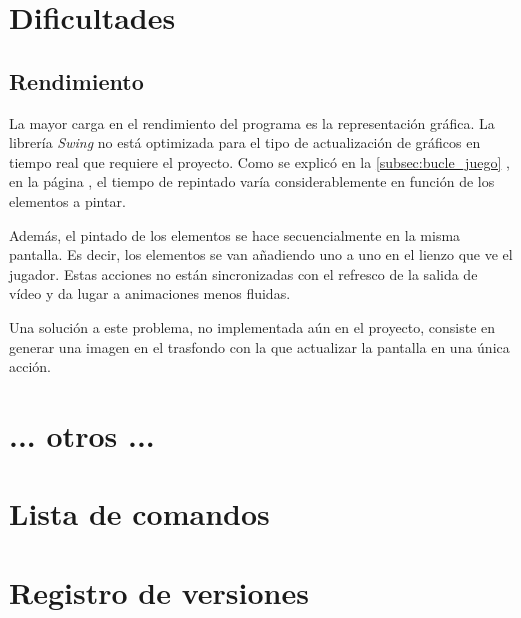 \documentclass[a4paper,
	11pt,
	parskip=full,
	bibliography=totoc,
	twoside
	]{scrartcl}
\let\oldsection\section
\def\section{\cleardoubleoddpage\oldsection}
\renewcommand{\sectionmark}[1]{\markright{\thesection.\ #1}}
\begin{document}
\section{Dificultades}
\label{sec:dificultades}
	\subsection{Rendimiento}
	\label{subsec:rendimiento}
		La mayor carga en el rendimiento del programa es la representación gráfica. La librería \textit{Swing} no está optimizada para el tipo de actualización de gráficos en tiempo real que requiere el proyecto. Como se explicó en la \autoref{subsec:bucle_juego} , en la página \pageref{subsec:bucle_juego}, el tiempo de repintado varía considerablemente en función de los elementos a pintar.
		
		Además, el pintado de los elementos se hace secuencialmente en la misma pantalla. Es decir, los elementos se van añadiendo uno a uno en el lienzo que ve el jugador. Estas acciones no están sincronizadas con el refresco de la salida de vídeo y da lugar a animaciones menos fluidas.
		
		Una solución a este problema, no implementada aún en el proyecto, consiste en generar una imagen en el trasfondo con la que actualizar la pantalla en una única acción.

\section{ ... otros ...}

\cleardoubleoddpage
	\renewcommand{\sectionmark}[1]{}
\begin{thebibliography}{9}
	\raggedright
	
\end{thebibliography}
\markright{\appendixname}

\cleardoubleoddpage
\appendix
{}

\section{Lista de comandos}

\section{Registro de versiones}
\label{app:changelog}
	\begin{multicols}{2}
		
	\end{multicols}
\end{document}
